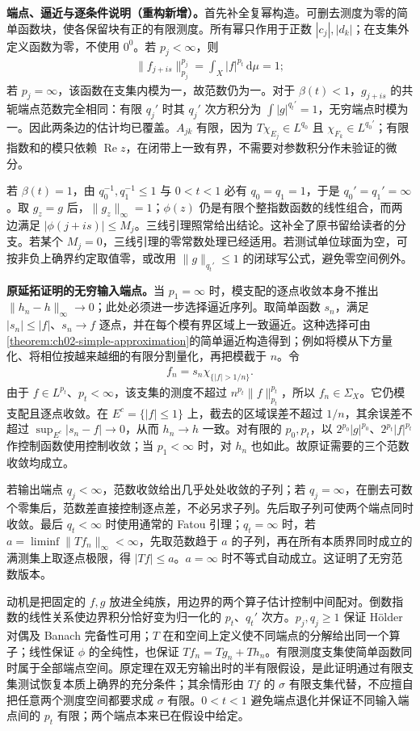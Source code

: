 \documentclass[../../main.tex]{subfiles}
\begin{document}
\begin{remark}
\textbf{端点、逼近与逐条件说明（重构新增）。}首先补全复幂构造。可删去测度为零的简单函数块，使各保留块有正的有限测度。所有幂只作用于正数 $|c_j|,|d_k|$；在支集外定义函数为零，不使用 $0^0$。若 $p_j<\infty$，则
\begin{align*}
\|f_{j+is}\|_{p_j}^{p_j}=\int_X|f|^{p_t}\,\mathrm d\mu=1;
\end{align*}
若 $p_j=\infty$，该函数在支集内模为一，故范数仍为一。对于 $\beta(t)<1$，$g_{j+is}$ 的共轭端点范数完全相同：有限 $q_j'$ 时其 $q_j'$ 次方积分为 $\int|g|^{q_t'}=1$，无穷端点时模为一。因此两条边的估计均已覆盖。$A_{jk}$ 有限，因为 $T\chi_{E_j}\in L^{q_0}$ 且 $\chi_{F_k}\in L^{q_0'}$；有限指数和的模只依赖 $\operatorname{Re}z$，在闭带上一致有界，不需要对参数积分作未验证的微分。

若 $\beta(t)=1$，由 $q_0^{-1},q_1^{-1}\leqslant1$ 与 $0<t<1$ 必有 $q_0=q_1=1$，于是 $q_0'=q_1'=\infty$。取 $g_z=g$ 后，$\|g_z\|_\infty=1$；$\phi(z)$ 仍是有限个整指数函数的线性组合，而两边满足 $|\phi(j+is)|\leqslant M_j$。三线引理照常给出结论。这补全了原书留给读者的分支。若某个 $M_j=0$，三线引理的零常数处理已经适用。若测试单位球面为空，可按非负上确界约定取值零，或改用 $\|g\|_{q_t'}\leqslant1$ 的闭球写公式，避免零空间例外。

\textbf{原延拓证明的无穷输入端点。}当 $p_1=\infty$ 时，模支配的逐点收敛本身不推出 $\|h_n-h\|_\infty\to0$；此处必须进一步选择逼近序列。取简单函数 $s_n$，满足 $|s_n|\leqslant|f|$、$s_n\to f$ 逐点，并在每个模有界区域上一致逼近。这种选择可由\cref{theorem:ch02-simple-approximation}的简单逼近构造得到；例如将模从下方量化、将相位按越来越细的有限分割量化，再把模截于 $n$。令
\begin{align*}
f_n=s_n\chi_{\{|f|>1/n\}}.
\end{align*}
由于 $f\in L^{p_t}$、$p_t<\infty$，该支集的测度不超过 $n^{p_t}\|f\|_{p_t}^{p_t}$，所以 $f_n\in\Sigma_X$。它仍模支配且逐点收敛。在 $E^c=\{|f|\leqslant1\}$ 上，截去的区域误差不超过 $1/n$，其余误差不超过 $\sup_{E^c}|s_n-f|\to0$，从而 $h_n\to h$ 一致。对有限的 $p_0,p_t$，以 $2^{p_0}|g|^{p_0}$、$2^{p_t}|f|^{p_t}$ 作控制函数使用控制收敛；当 $p_1<\infty$ 时，对 $h_n$ 也如此。故原证需要的三个范数收敛均成立。

若输出端点 $q_j<\infty$，范数收敛给出几乎处处收敛的子列；若 $q_j=\infty$，在删去可数个零集后，范数差直接控制逐点差，不必另求子列。先后取子列可使两个端点同时收敛。最后 $q_t<\infty$ 时使用通常的 Fatou 引理；$q_t=\infty$ 时，若 $a=\liminf\|Tf_n\|_\infty<\infty$，先取范数趋于 $a$ 的子列，再在所有本质界同时成立的满测集上取逐点极限，得 $|Tf|\leqslant a$。$a=\infty$ 时不等式自动成立。这证明了无穷范数版本。

动机是把固定的 $f,g$ 放进全纯族，用边界的两个算子估计控制中间配对。倒数指数的线性关系使边界积分恰好变为归一化的 $p_t$、$q_t'$ 次方。$p_j,q_j\geqslant1$ 保证 Hölder 对偶及 Banach 完备性可用；$T$ 在和空间上定义使不同端点的分解给出同一个算子；线性保证 $\phi$ 的全纯性，也保证 $Tf_n=Tg_n+Th_n$。有限测度支集使简单函数同时属于全部端点空间。原定理在双无穷输出时的半有限假设，是此证明通过有限支集测试恢复本质上确界的充分条件；其余情形由 $Tf$ 的 $\sigma$ 有限支集代替，不应擅自把任意两个测度空间都要求成 $\sigma$ 有限。$0<t<1$ 避免端点退化并保证不同输入端点间的 $p_t$ 有限；两个端点本来已在假设中给定。
\end{remark}
\end{document}
